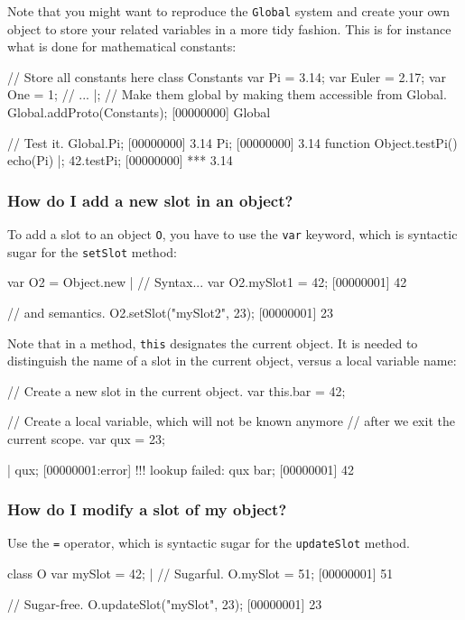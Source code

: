 Note that you might want to reproduce the \lstinline|Global| system
and create your own object to store your related variables in a more
tidy fashion. This is for instance what is done for mathematical
constants:

\begin{urbiscript}
// Store all constants here
class Constants
{
  var Pi = 3.14;
  var Euler = 2.17;
  var One = 1;
  // ...
}|;
// Make them global by making them accessible from Global.
Global.addProto(Constants);
[00000000] Global

// Test it.
Global.Pi;
[00000000] 3.14
Pi;
[00000000] 3.14
function Object.testPi() { echo(Pi) }|;
42.testPi;
[00000000] *** 3.14
\end{urbiscript}

\subsubsection{How do I add a new slot in an object?}
To add a slot to an object \lstinline{O}, you have to use the
\lstinline{var} keyword, which is syntactic sugar for the
\lstinline{setSlot} method:

\begin{urbiscript}
var O2 = Object.new |
// Syntax...
var O2.mySlot1 = 42;
[00000001] 42

// and semantics.
O2.setSlot("mySlot2", 23);
[00000001] 23
\end{urbiscript}

Note that in a method, \lstinline{this} designates the current
object.  It is needed to distinguish the name of a slot in the current
object, versus a local variable name:

\begin{urbiscript}
{
  // Create a new slot in the current object.
  var this.bar = 42;

  // Create a local variable, which will not be known anymore
  // after we exit the current scope.
  var qux = 23;
}|
qux;
[00000001:error] !!! lookup failed: qux
bar;
[00000001] 42
\end{urbiscript}


\subsubsection{How do I modify a slot of my object?}
Use the \lstinline|=| operator, which is syntactic sugar for the
\lstinline|updateSlot| method.

\begin{urbiscript}
class O
{
  var mySlot = 42;
}|
// Sugarful.
O.mySlot = 51;
[00000001] 51

// Sugar-free.
O.updateSlot("mySlot", 23);
[00000001] 23
\end{urbiscript}

